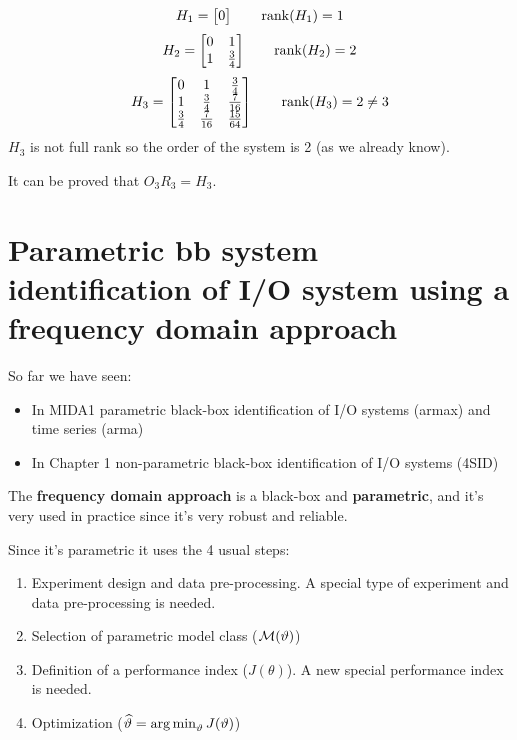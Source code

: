 \begin{example}
    \[
        H_1 = \begin{bmatrix}
            0
        \end{bmatrix}
        \qquad \operatorname*{rank} (H_1) = 1
    \]
    \[
        H_2 = \begin{bmatrix}
            0 & 1 \\
            1 & \frac{3}{4}
        \end{bmatrix}
        \qquad \operatorname*{rank} (H_2) = 2
    \]
    \[
        H_3 = \begin{bmatrix}
            0 & 1 & \frac{3}{4} \\
            1 & \frac{3}{4} & \frac{7}{16} \\
            \frac{3}{4} & \frac{7}{16} & \frac{15}{64}
        \end{bmatrix}
        \qquad \operatorname*{rank} (H_3) = 2 \neq 3
    \]
    $H_3$ is not full rank so the order of the system is 2 (as we already know). 
    
    It can be proved that $O_3R_3 = H_3$.
\end{example}

\chapter{Parametric \acrlong{bb} system identification of I/O system using a frequency domain approach}

So far we have seen:
\begin{itemize}
    \item In MIDA1 parametric black-box identification of I/O systems (\gls{armax}) and time series (\gls{arma})
    \item In Chapter 1 non-parametric black-box identification of I/O systems (4SID)
\end{itemize}

The \textbf{frequency domain approach} is a black-box and \textbf{parametric}, and it's very used in practice since it's very robust and reliable.

Since it's parametric it uses the 4 usual steps:
\begin{enumerate}
    \item Experiment design and data pre-processing. A special type of experiment and data pre-processing is needed.
    \item Selection of parametric model class ($\mathcal{M}(\vartheta)$)
    \item Definition of a performance index ($J(\theta)$). A new special performance index is needed.
    \item Optimization ($\widehat{\vartheta} = \operatorname*{arg\,min}_\vartheta J(\vartheta)$)
\end{enumerate}

